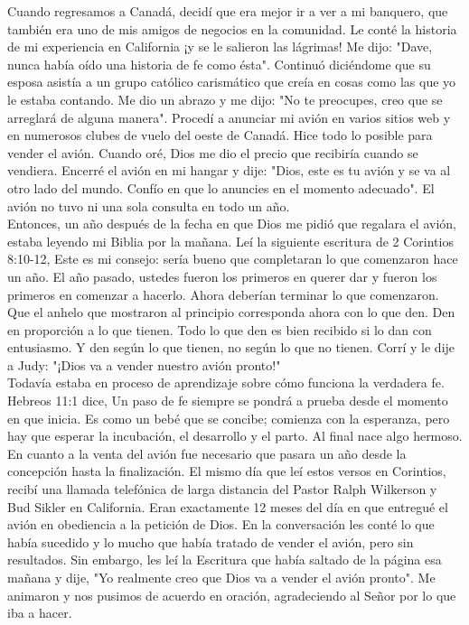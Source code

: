 \documentclass[twoside, 12pt]{book}
\begin{document}
Cuando regresamos a Canadá, decidí que era mejor ir a ver a mi banquero, que también era uno de mis amigos de negocios en la comunidad. Le conté la historia de mi experiencia en California ¡y se le salieron las lágrimas! Me dijo: "Dave, nunca había oído una historia de fe como ésta". Continuó diciéndome que su esposa asistía a un grupo católico carismático que creía en cosas como las que yo le estaba contando. Me dio un abrazo y me dijo: "No te preocupes, creo que se arreglará de alguna manera".
Procedí a anunciar mi avión en varios sitios web y en numerosos clubes de vuelo del oeste de Canadá. Hice todo lo posible para vender el avión. Cuando oré, Dios me dio el precio que recibiría cuando se vendiera. Encerré el avión en mi hangar y dije: "Dios, este es tu avión y se va al otro lado del mundo. Confío en que lo anuncies en el momento adecuado". El avión no tuvo ni una sola consulta en todo un año.\\

Entonces, un año después de la fecha en que Dios me pidió que regalara el avión, estaba leyendo mi Biblia por la mañana. Leí la siguiente escritura de 2 Corintios 8:10-12, Este es mi consejo: sería bueno que completaran lo que comenzaron hace un año. El año pasado, ustedes fueron los primeros en querer dar y fueron los primeros en comenzar a hacerlo. Ahora deberían terminar lo que comenzaron. Que el anhelo que mostraron al principio corresponda ahora con lo que den. Den en proporción a lo que tienen. Todo lo que den es bien recibido si lo dan con entusiasmo. Y den según lo que tienen, no según lo que no tienen. Corrí y le dije a Judy: "¡Dios va a vender nuestro avión pronto!"\\

Todavía estaba en proceso de aprendizaje sobre cómo funciona la verdadera fe. Hebreos 11:1 dice,  Un paso de fe siempre se pondrá a prueba desde el momento en que inicia. Es como un bebé que se concibe; comienza con la esperanza, pero hay que esperar la incubación, el desarrollo y el parto. Al final nace algo hermoso. En cuanto a la venta del avión fue necesario que pasara un año desde la concepción hasta la finalización.  El mismo día que leí estos versos en Corintios, recibí una llamada telefónica de larga distancia del Pastor Ralph Wilkerson y Bud Sikler en California. Eran exactamente 12 meses del día en que entregué el avión en obediencia a la petición de Dios. En la conversación les conté lo que había sucedido y lo mucho que había tratado de vender el avión, pero sin resultados. Sin embargo, les leí la Escritura que había saltado de la página esa mañana y dije, "Yo realmente creo que Dios va a vender el avión pronto". Me animaron y nos pusimos de acuerdo en oración, agradeciendo al Señor por lo que iba a hacer.\\
\end{document}
